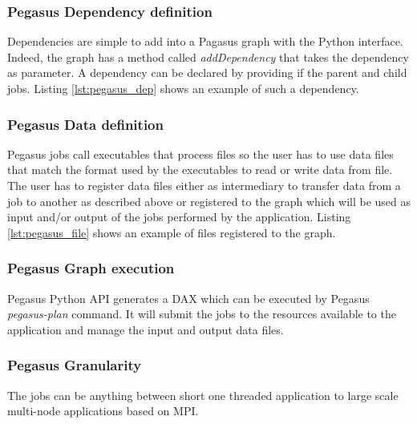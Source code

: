 

\subsubsection{Pegasus Dependency definition}
Dependencies are simple to add into a Pagasus graph with the Python interface.
Indeed, the graph has a method called \textit{addDependency} that takes the dependency as parameter.
A dependency can be declared by providing if the parent and child jobs.
Listing \ref{lst:pegasus_dep} shows an example of such a dependency.



\subsubsection{Pegasus Data definition}

Pegasus jobs call executables that process files so the user has to use data files that match the format used by the executables to read or write data from file.
The user has to register data files either as intermediary to transfer data from a job to another as described above or registered to the graph which will be used as input and/or output of the jobs performed by the application.
Listing \ref{lst:pegasus_file} shows an example of files registered to the graph.



\subsubsection{Pegasus Graph execution}
Pegasus Python API generates a DAX which can be executed by Pegasus \textit{pegasus-plan} command.
It will submit the jobs to the resources available to the application and manage the input and output data files.

\subsubsection{Pegasus Granularity}
The jobs can be anything between short one threaded application to large scale multi-node applications based on MPI.

